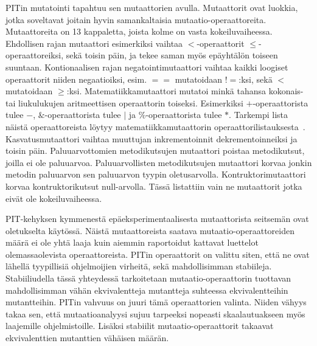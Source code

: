 \documentclass[finnish]{tktltiki2}
\begin{document}
PITin mutatointi tapahtuu sen mutaattorien avulla. Mutaattorit ovat luokkia, jotka soveltavat joitain hyvin samankaltaisia mu\-taa\-tio\--ope\-raatto\-reita. Mutaattoreita on 13 kappaletta, joista kolme on vasta kokeiluvaiheessa. Ehdollisen rajan mutaattori esimerkiksi vaihtaa $<$-operaattorit $\leq$\--ope\-raatto\-reik\-si, sekä toisin päin, ja tekee saman myös epäyhtälön toiseen suuntaan. Kontionaalisen rajan negatointimutaattori vaihtaa kaikki loogiset operaattorit niiden negaatioiksi, esim. $==$ mutatoidaan $!=$:ksi, sekä $<$ mutatoidaan $\geq$:ksi. Matematiikkamutaattori mutatoi minkä tahansa kokonais- tai liukulukujen aritmeettisen operaattorin toiseksi. Esimerkiksi $+$-operaattorista tulee $-$, $\&$-operaattorista tulee $|$ ja $\%$-operaattorista tulee $*$. Tarkempi lista näistä operaattoreista löytyy matematiikkamutaattorin operaattorilistauksesta~\cite{PITMathMutations}. Kasvatusmutaattori vaihtaa muuttujan inkrementoinnit dekrementoinneiksi ja toisin päin. Paluuarvottomien metodikutsujen mutaattori poistaa metodikutsut, joilla ei ole paluuarvoa. Paluuarvollisten metodikutsujen mutaattori korvaa jonkin metodin paluuarvon sen paluuarvon tyypin oletusarvolla. Kontruktorimutaattori korvaa kontruktorikutsut null-arvolla. Tässä listattiin vain ne mutaattorit jotka eivät ole kokeiluvaiheessa.

PIT-kehyksen kymmenestä epäeksperimentaalisesta mutaattorista seitsemän ovat oletukselta käytössä. Näistä mutaattoreista saatava mu\-taa\-tio\--ope\-raatto\-reiden määrä ei ole yhtä laaja kuin aiemmin raportoidut kattavat luettelot olemassaolevista operaattoreista. PITin operaattorit on valittu siten, että ne ovat lähellä tyypillisiä ohjelmoijien virheitä, sekä mahdollisimman stabiileja. Stabiiliudella tässä yhteydessä tarkoitetaan mu\-taa\-tio\--ope\-raatto\-rin tuottavan mahdollisimman vähän ekvivalentteja mutantteja suhteessa ekvivalentteihin mutantteihin. PITin vahvuus on juuri tämä operaattorien valinta. Niiden vähyys takaa sen, että mutaatioanalyysi sujuu tarpeeksi nopeasti skaalautuakseen myös laajemille ohjelmistoille. Lisäksi stabiilit mu\-taa\-tio\--ope\-raatto\-rit takaavat ekvivalenttien mutanttien vähäisen määrän.
\end{document}
